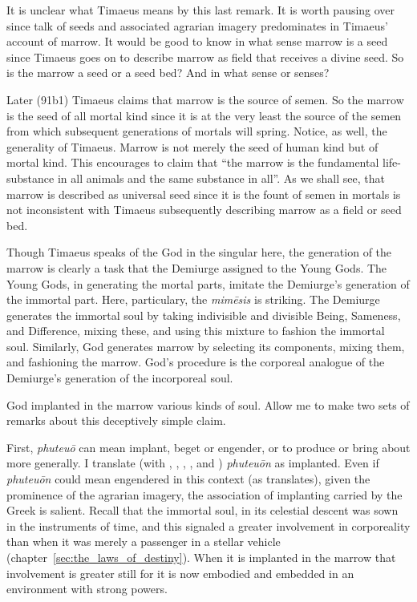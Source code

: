 It is unclear what Timaeus means by this last remark. It is worth pausing over since talk of seeds and associated agrarian imagery predominates in Timaeus' account of marrow. It would be good to know in what sense marrow is a seed since Timaeus goes on to describe marrow as field that receives a divine seed. So is the marrow a seed or a seed bed? And in what sense or senses?

Later (91b1) Timaeus claims that marrow is the source of semen. So the marrow is the seed of all mortal kind since it is at the very least the source of the semen from which subsequent generations of mortals will spring. Notice, as well, the generality of Timaeus. Marrow is not merely the seed of human kind \citep[73]{Waterfield:2008lx} but of mortal kind. This encourages \citet[295]{Cornford:1935fk} to claim that ``the marrow is the fundamental life-substance in all animals and the same substance in all''. As we shall see, that marrow is described as universal seed since it is the fount of semen in mortals is not inconsistent with Timaeus subsequently describing marrow as a field or seed bed.

Though Timaeus speaks of the God in the singular here, the generation of the marrow is clearly a task that the Demiurge assigned to the Young Gods. The Young Gods, in generating the mortal parts, imitate the Demiurge's generation of the immortal part. Here, particulary, the \emph{mimēsis} is striking. The Demiurge generates the immortal soul by taking indivisible and divisible Being, Sameness, and Difference, mixing these, and using this mixture to fashion the immortal soul. Similarly, God generates marrow by selecting its components, mixing them, and fashioning the marrow. God's procedure is the corporeal analogue of the Demiurge's generation of the incorporeal soul.

God implanted in the marrow various kinds of soul. Allow me to make two sets of remarks about this deceptively simple claim.

First, \emph{phuteuō} can mean implant, beget or engender, or to produce or bring about more generally. I translate (with \citealt[271]{Archer-Hind:1888qd}, \citealt[293]{Cornford:1935fk}, \citealt[70]{Lee:2008ca}, \citealt[77]{Taylor:1929ov} \citealt[73]{Waterfield:2003gs}, and \citealt[67]{Zeyl:2000cs}) \emph{phuteuōn} as implanted. Even if \emph{phuteuōn} could mean engendered in this context (as \citealt[191--3]{Bury:1929jb} translates), given the prominence of the agrarian imagery, the association of implanting carried by the Greek is salient. Recall that the immortal soul, in its celestial descent was sown in the instruments of time, and this signaled a greater involvement in corporeality than when it was merely a passenger in a stellar vehicle (chapter~\ref{sec:the_laws_of_destiny}). When it is implanted in the marrow that involvement is greater still for it is now embodied and embedded in an environment with strong powers.

